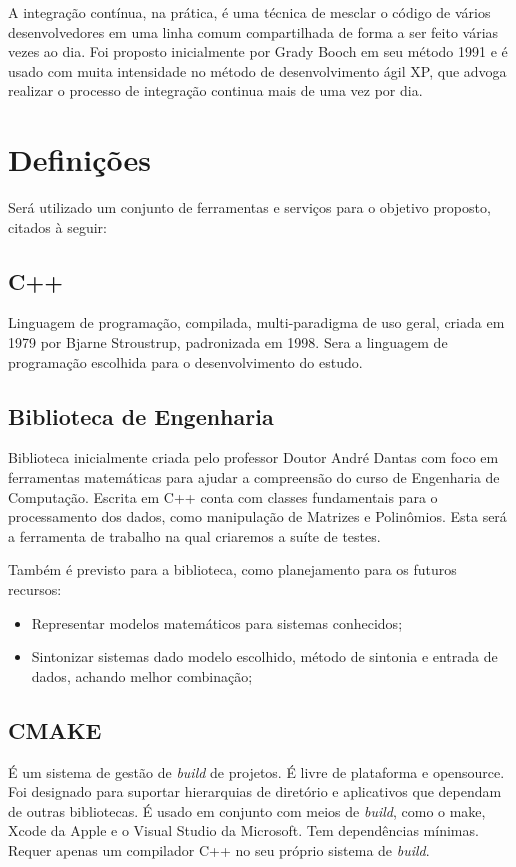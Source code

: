 \documentclass[
	article,			%
	12pt,				%
	oneside,			%
	a4paper,			%
	english,			%
	brazil,				%
	sumario=tradicional
	]{abntex2}
\begin{document}
A integração contínua, na prática, é uma técnica de mesclar o código de vários desenvolvedores em uma linha comum compartilhada de forma a ser feito várias vezes ao dia. Foi proposto inicialmente por Grady Booch em seu método 1991 e é usado com muita intensidade no método de desenvolvimento ágil XP, que advoga realizar o processo de integração continua mais de uma vez por dia.

\section{Definições}

Será utilizado um conjunto de ferramentas e serviços para o objetivo proposto, citados à seguir:

\subsection{C++}

Linguagem de programação, compilada, multi-paradigma de uso geral, criada em 1979 por Bjarne Stroustrup, padronizada em 1998. Sera a linguagem de programação escolhida para o desenvolvimento do estudo.

\subsection{Biblioteca de Engenharia}

Biblioteca inicialmente criada pelo professor Doutor André Dantas com foco em ferramentas matemáticas para ajudar a compreensão do curso de Engenharia de Computação. Escrita em C++ conta com classes fundamentais para o processamento dos dados, como manipulação de Matrizes e Polinômios. Esta será a ferramenta de trabalho na qual criaremos a suíte de testes.

Também é previsto para a biblioteca, como planejamento para os futuros recursos:

\begin{itemize}
	\item Representar modelos matemáticos para sistemas conhecidos;
	\item Sintonizar sistemas dado modelo escolhido, método de sintonia e entrada de dados, achando melhor combinação;
\end{itemize}


\subsection{CMAKE}
É um sistema de gestão de \textit{build} de projetos. É livre de plataforma e opensource. Foi designado para suportar hierarquias de diretório e aplicativos que dependam de outras bibliotecas. É usado em conjunto com meios de \textit{build}, como o make, Xcode da Apple e o Visual Studio da Microsoft. Tem dependências mínimas. Requer apenas um compilador C++ no seu próprio sistema de \textit{build}.
\end{document}
